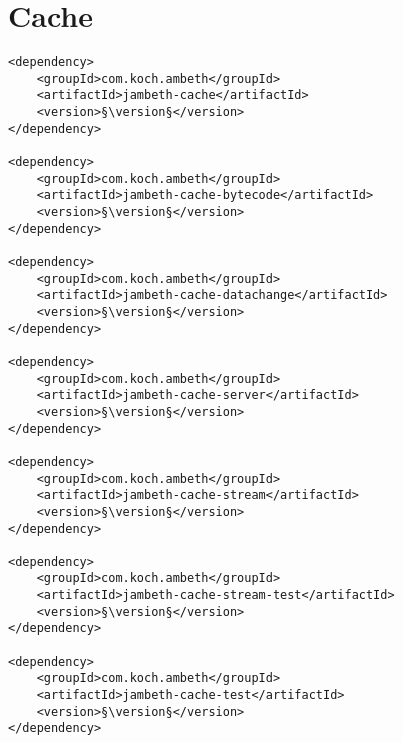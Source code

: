 \section{Cache}
\label{module:Cache}
\ClearAPI
\TODO
\begin{lstlisting}[style=POM,caption={Maven modules to use \emph{Ambeth Cache}}]
<dependency>
	<groupId>com.koch.ambeth</groupId>
	<artifactId>jambeth-cache</artifactId>
	<version>§\version§</version>
</dependency>

<dependency>
	<groupId>com.koch.ambeth</groupId>
	<artifactId>jambeth-cache-bytecode</artifactId>
	<version>§\version§</version>
</dependency>

<dependency>
	<groupId>com.koch.ambeth</groupId>
	<artifactId>jambeth-cache-datachange</artifactId>
	<version>§\version§</version>
</dependency>

<dependency>
	<groupId>com.koch.ambeth</groupId>
	<artifactId>jambeth-cache-server</artifactId>
	<version>§\version§</version>
</dependency>

<dependency>
	<groupId>com.koch.ambeth</groupId>
	<artifactId>jambeth-cache-stream</artifactId>
	<version>§\version§</version>
</dependency>

<dependency>
	<groupId>com.koch.ambeth</groupId>
	<artifactId>jambeth-cache-stream-test</artifactId>
	<version>§\version§</version>
</dependency>

<dependency>
	<groupId>com.koch.ambeth</groupId>
	<artifactId>jambeth-cache-test</artifactId>
	<version>§\version§</version>
</dependency>
\end{lstlisting}
